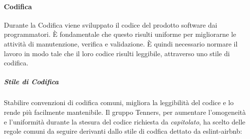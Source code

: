 \paragraph{Codifica}
Durante la Codifica viene sviluppato il codice del prodotto software dai programmatori. È fondamentale che questo risulti uniforme per migliorarne le attività di manutenzione, verifica e validazione. È quindi necessario normare il lavoro in modo tale che il loro codice risulti leggibile, attraverso uno stile di codifica.
\subparagraph*{Stile di Codifica}
Stabilire convenzioni di codifica comuni, migliora la leggibilità del codice e lo rende più facilmente mantenibile. Il gruppo Tenners, per aumentare l'omogeneità e l'uniformità durante la stesura del codice richiesta da \textit{capitolato\glos}, ha scelto delle regole comuni da seguire derivanti dallo stile di codfica dettato da eslint-airbnb:
